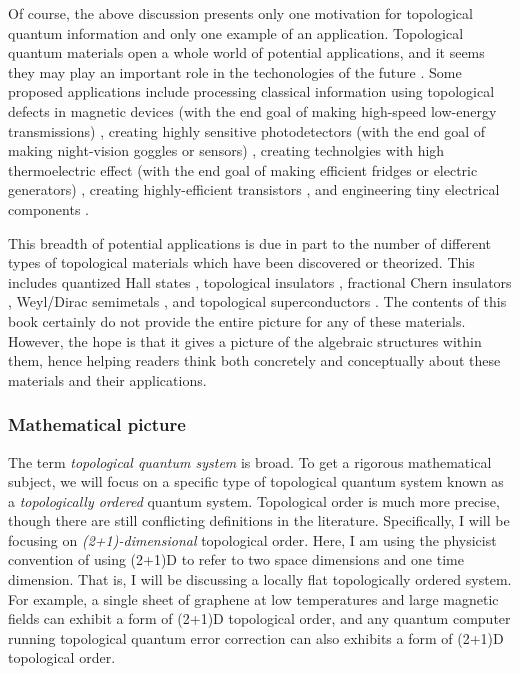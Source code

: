Of course, the above discussion presents only one motivation for topological quantum information and only one example of an application. Topological quantum materials open a whole world of potential applications, and it seems they may play an important role in the techonologies of the future \cite{ramirez2020dawn}. Some proposed applications include processing classical information using topological defects in magnetic devices (with the end goal of making high-speed low-energy transmissions) \cite{marrows2021perspective, vsmejkal2018topological}, creating highly sensitive photodetectors (with the end goal of making night-vision goggles or sensors) \cite{chan2017photocurrents}, creating technolgies with high thermoelectric effect (with the end goal of making efficient fridges or electric generators) \cite{skinner2018large}, creating highly-efficient transistors \cite{fuhrer2021proposal}, and engineering tiny electrical components \cite{viola2014hall, placke2017model}. 

This breadth of potential applications is due in part to the number of different types of topological materials which have been discovered or theorized. This includes quantized Hall states \cite{von202040}, topological insulators \cite{hasan2010colloquium}, fractional Chern insulators \cite{regnault2011fractional}, Weyl/Dirac semimetals \cite{armitage2018weyl}, and topological superconductors \cite{sato2017topological}. The contents of this book certainly do not provide the entire picture for any of these materials. However, the hope is that it gives a picture of the algebraic structures within them, hence helping readers think both concretely and conceptually about these materials and their applications.

\subsubsection{Mathematical picture}

The term \textit{topological quantum system} is broad. To get a rigorous mathematical subject, we will focus on a specific type of topological quantum system known as a \textit{topologically ordered} quantum system. Topological order is much more precise, though there are still conflicting definitions in the literature. Specifically, I will be focusing on \textit{(2+1)-dimensional} topological order. Here, I am using the physicist convention of using (2+1)D to refer to two space dimensions and one time dimension. That is, I will be discussing a locally flat topologically ordered system. For example, a single sheet of graphene at low temperatures and large magnetic fields can exhibit a form of (2+1)D topological order, and any quantum computer running topological quantum error correction can also exhibits a form of (2+1)D topological order.

